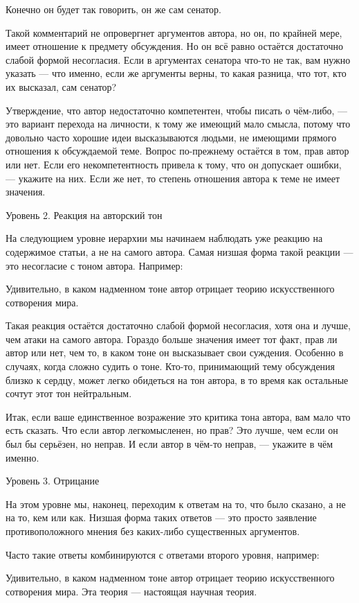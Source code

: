 \documentclass[ebook,12pt,oneside,openany]{memoir}
\begin{document}
Конечно он будет так говорить, он же сам сенатор.

Такой комментарий не опровергнет аргументов автора, но он, по крайней
мере, имеет отношение к предмету обсуждения. Но он всё равно остаётся
достаточно слабой формой несогласия. Если в аргументах сенатора что-то
не так, вам нужно указать — что именно, если же аргументы верны, то
какая разница, что тот, кто их высказал, сам сенатор?

Утверждение, что автор недостаточно компетентен, чтобы писать о
чём-либо, — это вариант перехода на личности, к тому же имеющий мало
смысла, потому что довольно часто хорошие идеи высказываются людьми,
не имеющими прямого отношения к обсуждаемой теме. Вопрос по-прежнему
остаётся в том, прав автор или нет. Если его некомпетентность привела
к тому, что он допускает ошибки, — укажите на них. Если же нет, то
степень отношения автора к теме не имеет значения.

Уровень 2. Реакция на авторский тон

На следующием уровне иерархии мы начинаем наблюдать уже реакцию на
содержимое статьи, а не на самого автора. Самая низшая форма такой
реакции — это несогласие с тоном автора. Например:

Удивительно, в каком надменном тоне автор отрицает теорию
искусственного сотворения мира.

Такая реакция остаётся достаточно слабой формой несогласия, хотя она и
лучше, чем атаки на самого автора. Гораздо больше значения имеет тот
факт, прав ли автор или нет, чем то, в каком тоне он высказывает свои
суждения. Особенно в случаях, когда сложно судить о тоне. Кто-то,
принимающий тему обсуждения близко к сердцу, может легко обидеться на
тон автора, в то время как остальные сочтут этот тон нейтральным.

Итак, если ваше единственное возражение это критика тона автора, вам
мало что есть сказать. Что если автор легкомысленен, но прав? Это
лучше, чем если он был бы серьёзен, но неправ. И если автор в чём-то
неправ, — укажите в чём именно.

Уровень 3. Отрицание

На этом уровне мы, наконец, переходим к ответам на то, что было
сказано, а не на то, кем или как. Низшая форма таких ответов — это
просто заявление противоположного мнения без каких-либо существенных
аргументов.

Часто такие ответы комбинируются с ответами второго уровня, например:

Удивительно, в каком надменном тоне автор отрицает теорию
искусственного сотворения мира. Эта теория — настоящая научная теория.
\end{document}
